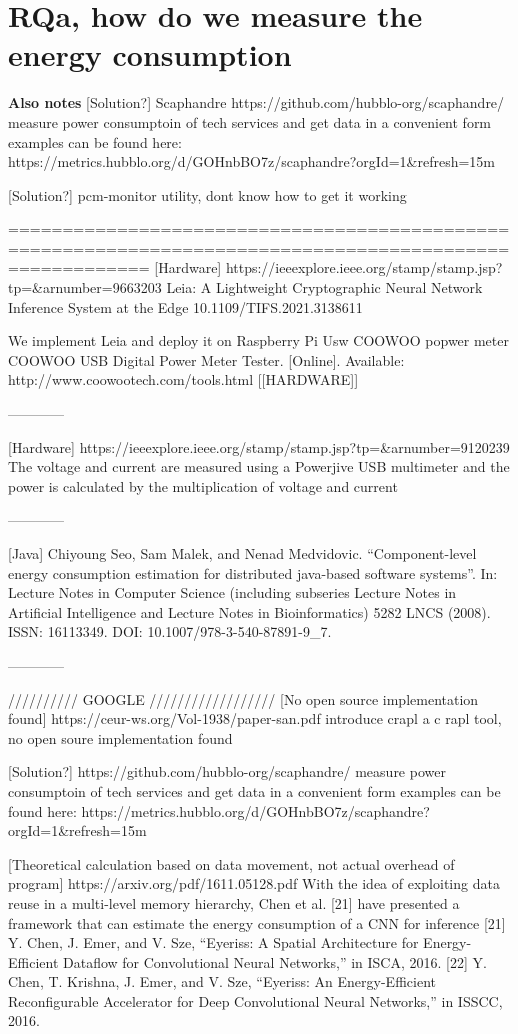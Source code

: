 \documentclass[../theses.tex]{subfiles}
\begin{document}
\section{RQa, how do we measure the energy consumption}
\color{red}\textbf{Also notes}\color{black}
[Solution?] Scaphandre
https://github.com/hubblo-org/scaphandre/
measure power consumptoin of tech services and get data in a convenient form
examples can be found here: https://metrics.hubblo.org/d/GOHnbBO7z/scaphandre?orgId=1&refresh=15m

[Solution?] pcm-monitor utility, dont know how to get it working

=========================================================================================================
[Hardware]
https://ieeexplore.ieee.org/stamp/stamp.jsp?tp=&arnumber=9663203
Leia: A Lightweight Cryptographic Neural Network Inference System at the Edge
 10.1109/TIFS.2021.3138611

We implement Leia and deploy it on Raspberry Pi
Usw COOWOO popwer meter COOWOO USB Digital Power Meter Tester. [Online]. Available:
http://www.coowootech.com/tools.html [[HARDWARE]]

------------

[Hardware]
https://ieeexplore.ieee.org/stamp/stamp.jsp?tp=&arnumber=9120239
The voltage and current are measured using a
Powerjive USB multimeter and the power is calculated by the
multiplication of voltage and current

------------

[Java] 
Chiyoung Seo, Sam Malek, and Nenad Medvidovic. “Component-level energy
consumption estimation for distributed java-based software systems”. In: Lecture Notes in Computer Science (including subseries Lecture Notes in Artificial Intelligence and Lecture Notes in Bioinformatics) 5282 LNCS (2008). ISSN:
16113349. DOI: 10.1007/978-3-540-87891-9\_7.

------------

////////// GOOGLE //////////////////
[No open source implementation found]
https://ceur-ws.org/Vol-1938/paper-san.pdf
introduce crapl a c rapl tool, no open soure implementation found

[Solution?]
https://github.com/hubblo-org/scaphandre/
measure power consumptoin of tech services and get data in a convenient form
examples can be found here: https://metrics.hubblo.org/d/GOHnbBO7z/scaphandre?orgId=1&refresh=15m

[Theoretical calculation based on data movement, not actual overhead of program]
https://arxiv.org/pdf/1611.05128.pdf
With the idea of exploiting data reuse in a multi-level memory hierarchy, Chen et al. [21] have presented a framework that can estimate the energy consumption of a CNN for inference
[21] Y. Chen, J. Emer, and V. Sze, “Eyeriss: A Spatial Architecture for Energy-Efficient Dataflow for Convolutional Neural Networks,” in ISCA, 2016.
[22] Y. Chen, T. Krishna, J. Emer, and V. Sze, “Eyeriss: An Energy-Efficient Reconfigurable Accelerator for Deep Convolutional Neural Networks,” in ISSCC, 2016.
\end{document}
